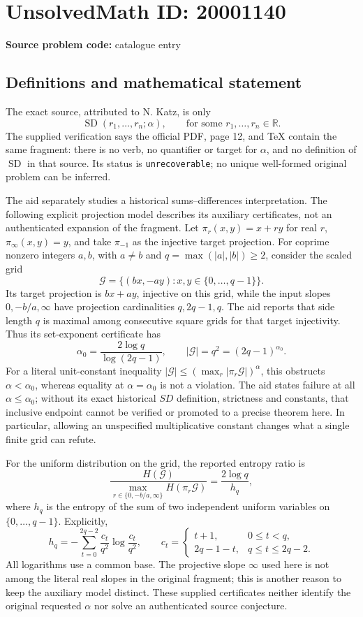 \documentclass[11pt]{article}
\newcommand{\R}{\mathbb{R}}
\begin{document}
\section*{UnsolvedMath ID: 20001140}
\textbf{Source problem code:} catalogue entry
\subsection{Definitions and mathematical statement}
The exact source, attributed to N. Katz, is only
\[
 \operatorname{SD}(r_1,\ldots,r_n;\alpha),\qquad
 \text{for some }r_1,\ldots,r_n\in\R.
\]
The supplied verification says the official PDF, page 12, and TeX contain the same fragment: there is no verb, no quantifier or target for \(\alpha\), and no definition of \(\operatorname{SD}\) in that source. Its status is \texttt{unrecoverable}; no unique well-formed original problem can be inferred.

The aid separately studies a historical sums--differences interpretation. The following explicit projection model describes its auxiliary certificates, not an authenticated expansion of the fragment. Let \(\pi_r(x,y)=x+ry\) for real \(r\), \(\pi_\infty(x,y)=y\), and take \(\pi_{-1}\) as the injective target projection. For coprime nonzero integers \(a,b\), with \(a\ne b\) and \(q=\max(|a|,|b|)\ge2\), consider the scaled grid
\[
 \mathcal G=\{(bx,-ay):x,y\in\{0,\ldots,q-1\}\}.
\]
Its target projection is \(bx+ay\), injective on this grid, while the input slopes \(0,-b/a,\infty\) have projection cardinalities \(q,2q-1,q\). The aid reports that side length \(q\) is maximal among consecutive square grids for that target injectivity. Thus its set-exponent certificate has
\[
 \alpha_0=\frac{2\log q}{\log(2q-1)},\qquad
 |\mathcal G|=q^2=(2q-1)^{\alpha_0}.
\]
For a literal unit-constant inequality \(|\mathcal G|\le(\max_r|\pi_r\mathcal G|)^\alpha\), this obstructs \(\alpha<\alpha_0\), whereas equality at \(\alpha=\alpha_0\) is not a violation. The aid states failure at all \(\alpha\le\alpha_0\); without its exact historical \(SD\) definition, strictness and constants, that inclusive endpoint cannot be verified or promoted to a precise theorem here. In particular, allowing an unspecified multiplicative constant changes what a single finite grid can refute.

For the uniform distribution on the grid, the reported entropy ratio is
\[
 \frac{H(\mathcal G)}{\max_{r\in\{0,-b/a,\infty\}}H(\pi_r\mathcal G)}
 =\frac{2\log q}{h_q},
\]
where \(h_q\) is the entropy of the sum of two independent uniform variables on \(\{0,\ldots,q-1\}\). Explicitly,
\[
 h_q=-\sum_{t=0}^{2q-2}\frac{c_t}{q^2}\log\frac{c_t}{q^2},\qquad
 c_t=\begin{cases}t+1,&0\le t<q,\\2q-1-t,&q\le t\le2q-2.\end{cases}
\]
All logarithms use a common base. The projective slope \(\infty\) used here is not among the literal real slopes in the original fragment; this is another reason to keep the auxiliary model distinct. These supplied certificates neither identify the original requested \(\alpha\) nor solve an authenticated source conjecture.
\end{document}
